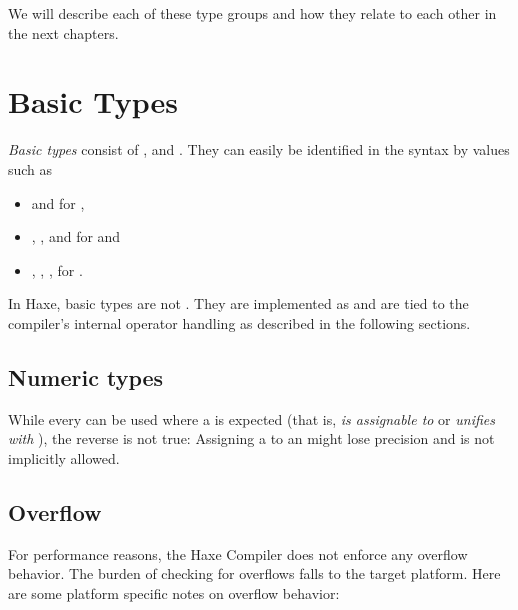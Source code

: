 We will describe each of these type groups and how they relate to each other in the next chapters.



\section{Basic Types}
\label{types-basic-types}

\emph{Basic types} consist of ,  and . They can easily be identified in the syntax by values such as

\begin{itemize}
	\item {} and  for ,
	\item {}, ,  and  for  and
	\item {}, , ,  for .
\end{itemize}

In Haxe, basic types are not . They are implemented as  and are tied to the compiler's internal operator handling as described in the following sections.

\subsection{Numeric types}
\label{types-numeric-types}


While every  can be used where a  is expected (that is,  \emph{is assignable to} or \emph{unifies with} ), the reverse is not true: Assigning a  to an  might lose precision and is not implicitly allowed.

\subsection{Overflow}
\label{types-overflow}

For performance reasons, the Haxe Compiler does not enforce any overflow behavior.  The burden of checking for overflows falls to the target platform. Here are some platform specific notes on overflow behavior:

